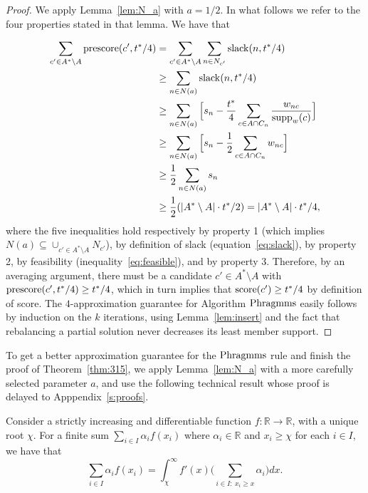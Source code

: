 \begin{proof}
We apply Lemma~\ref{lem:N_a} with $a=1/2$. In what follows we refer to the four properties stated in that lemma. We have that

\begin{align*}
    \sum_{c'\in A^*\setminus A} \operatorname{prescore}(c',t^*/4) &=\sum_{c'\in A^*\setminus A} \sum_{n\in N_{c'}} \operatorname{slack}(n,t^*/4) \\
		&\geq \sum_{n\in N(a)} \operatorname{slack}(n,t^*/4) \\
    &\geq \sum_{n\in N(a)} \Big[ s_n - \frac{t^*}{4}\sum_{c\in A\cap C_n} \frac{w_{nc}}{\operatorname{supp}_w(c)} \Big] \\
    &\geq \sum_{n\in N(a)} \Big[ s_n - \frac{1}{2}\sum_{c\in A\cap C_n} w_{nc} \Big] \\
    &\geq \frac{1}{2}\sum_{n\in N(a)} s_n \\
		&\geq \frac{1}{2} (|A^*\setminus A|\cdot t^*/2) = |A^*\setminus A|\cdot t^*/4, 
\end{align*}
%
where the five inequalities hold respectively by property 1 (which implies $N(a)\subseteq \cup_{c'\in A^*\setminus A} N_{c'}$), by definition of slack (equation~\ref{eq:slack}), by property 2, by feasibility (inequality~\ref{eq:feasible}), and by property 3.
Therefore, by an averaging argument, there must be a candidate $c'\in A^*\setminus A$ with $\operatorname{prescore}(c',t^*/4)\geq t^*/4$, which in turn implies that $\operatorname{score}(c')\geq t^*/4$ by definition of score. 
The $4$-approximation guarantee for Algorithm $\operatorname{Phragmms}$ easily follows by induction on the $k$ iterations, using Lemma~\ref{lem:insert} and the fact that rebalancing a partial solution never decreases its least member support.
\end{proof}

To get a better approximation guarantee for the $\operatorname{Phragmms}$ rule and finish the proof of Theorem~\ref{thm:315}, we apply Lemma~\ref{lem:N_a} with a more carefully selected parameter $a$, and use the following technical result whose proof is delayed to Apppendix~\ref{s:proofs}.

\begin{lemma}\label{lem:Lebesgue}
Consider a strictly increasing and differentiable function $f:\mathbb{R}\rightarrow \mathbb{R}$, with a unique root $\chi$. For a finite sum $\sum_{i\in I} \alpha_i f(x_i)$ where $\alpha_i\in\mathbb{R}$ and $ x_i\geq \chi$ for each $i\in I$, we have that
$$\sum_{i\in I} \alpha_i f(x_i) = \int_{\chi}^{\infty} f'(x) \big(\sum_{i\in I: \ x_i\geq x} \alpha_i\big)dx.$$
\end{lemma}

